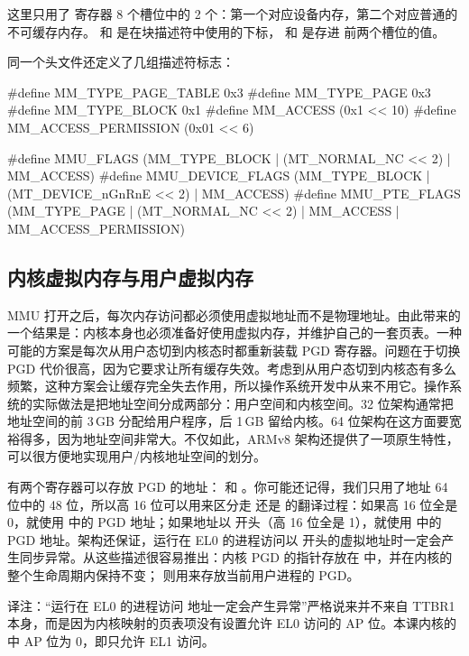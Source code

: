 这里只用了  寄存器 8 个槽位中的 2 个：第一个对应设备内存，第二个对应普通的不可缓存内存。 和  是在块描述符中使用的下标， 和  是存进  前两个槽位的值。

同一个头文件还定义了几组描述符标志：

\begin{ccode}
#define MM_TYPE_PAGE_TABLE		0x3
#define MM_TYPE_PAGE 			0x3
#define MM_TYPE_BLOCK			0x1
#define MM_ACCESS			(0x1 << 10)
#define MM_ACCESS_PERMISSION		(0x01 << 6)

#define MMU_FLAGS	 	(MM_TYPE_BLOCK | (MT_NORMAL_NC << 2) | MM_ACCESS)
#define MMU_DEVICE_FLAGS	(MM_TYPE_BLOCK | (MT_DEVICE_nGnRnE << 2) | MM_ACCESS)
#define MMU_PTE_FLAGS		(MM_TYPE_PAGE | (MT_NORMAL_NC << 2) | MM_ACCESS | MM_ACCESS_PERMISSION)
\end{ccode}

\subsection{内核虚拟内存与用户虚拟内存}

MMU 打开之后，每次内存访问都必须使用虚拟地址而不是物理地址。由此带来的一个结果是：内核本身也必须准备好使用虚拟内存，并维护自己的一套页表。一种可能的方案是每次从用户态切到内核态时都重新装载 PGD 寄存器。问题在于切换 PGD 代价很高，因为它要求让所有缓存失效。考虑到从用户态切到内核态有多么频繁，这种方案会让缓存完全失去作用，所以操作系统开发中从来不用它。操作系统的实际做法是把地址空间分成两部分：用户空间和内核空间。32 位架构通常把地址空间的前 3\,GB 分配给用户程序，后 1\,GB 留给内核。64 位架构在这方面要宽裕得多，因为地址空间非常大。不仅如此，ARMv8 架构还提供了一项原生特性，可以很方便地实现用户/内核地址空间的划分。

有两个寄存器可以存放 PGD 的地址： 和 。你可能还记得，我们只用了地址 64 位中的 48 位，所以高 16 位可以用来区分走  还是  的翻译过程：如果高 16 位全是 0，就使用  中的 PGD 地址；如果地址以  开头（高 16 位全是 1），就使用  中的 PGD 地址。架构还保证，运行在 EL0 的进程访问以  开头的虚拟地址时一定会产生同步异常。从这些描述很容易推出：内核 PGD 的指针存放在  中，并在内核的整个生命周期内保持不变； 则用来存放当前用户进程的 PGD。

\begin{remark}
  译注：“运行在 EL0 的进程访问  地址一定会产生异常”严格说来并不来自 TTBR1 本身，而是因为内核映射的页表项没有设置允许 EL0 访问的 AP 位。本课内核的  中 AP 位为 0，即只允许 EL1 访问。
\end{remark}

